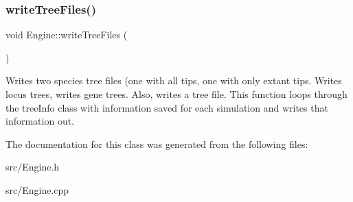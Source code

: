 \subsubsection{\texorpdfstring{writeTreeFiles()}{writeTreeFiles()}}
{\footnotesize\ttfamily void Engine\+::write\+Tree\+Files (\begin{DoxyParamCaption}{ }\end{DoxyParamCaption})}



Writes two species tree files (one with all tips, one with only extant tips. Writes locus trees, writes gene trees. Also, writes a tree file. This function loops through the tree\+Info class with information saved for each simulation and writes that information out. 



The documentation for this class was generated from the following files\+:\begin{DoxyCompactItemize}
\item 
src/Engine.\+h\item 
src/Engine.\+cpp\end{DoxyCompactItemize}
